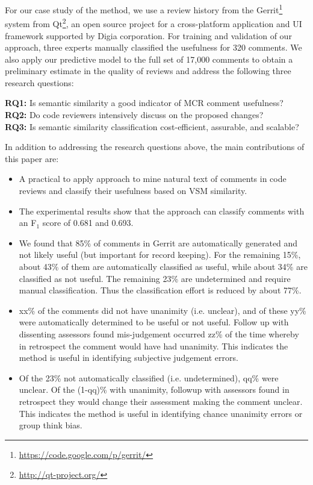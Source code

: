 For our case study of the method, we use a review history from the Gerrit\footnote{\url{https://code.google.com/p/gerrit/}} system from Qt\footnote{\url{http://qt-project.org/}}, an open source project for a cross-platform application and UI framework supported by Digia corporation. For training and validation of our approach, three experts manually classified the usefulness for 320 comments. We also apply our predictive model to the full set of 
17,000 
comments to obtain a preliminary estimate in the quality of reviews and address the following three research questions:

\noindent \textbf{RQ1:} Is semantic similarity a good indicator of MCR comment usefulness?\\
\noindent \textbf{RQ2:} Do code reviewers intensively discuss on the proposed changes?\\
\noindent \textbf{RQ3:} Is semantic similarity classification cost-efficient, assurable, and scalable?

\noindent In addition to addressing the research questions above, the main contributions of this paper are:
\begin{itemize}
\item A practical to apply approach to mine natural text of comments in code reviews and classify their usefulness based on VSM similarity.
\item The experimental results show that the approach can classify comments with an F$_1$ score of 0.681 and 0.693.
\item We found that 85\% of comments in Gerrit are automatically generated and not likely useful (but important for record keeping). For the remaining 15\%, about 43\% of them are automatically classified as useful, while about 34\% are classified as not useful. The remaining 23\% are undetermined and require manual classification. Thus the classification effort is reduced by about 77\%.
\item xx\% of the comments did not have unanimity (i.e. unclear), and of these yy\% were automatically determined to be useful or not useful. Follow up with dissenting assessors found mis-judgement occurred zz\% of the time whereby in retrospect the comment would have had unanimity. This indicates the method is useful in identifying subjective judgement errors. 
\item Of the 23\% not automatically classified (i.e. undetermined), qq\% were unclear. Of the (1-qq)\% with unanimity, followup with assessors found in retrospect they would change their assessment making the comment unclear. This indicates the method is useful in identifying chance unanimity errors or group think bias.
\end{itemize} 

